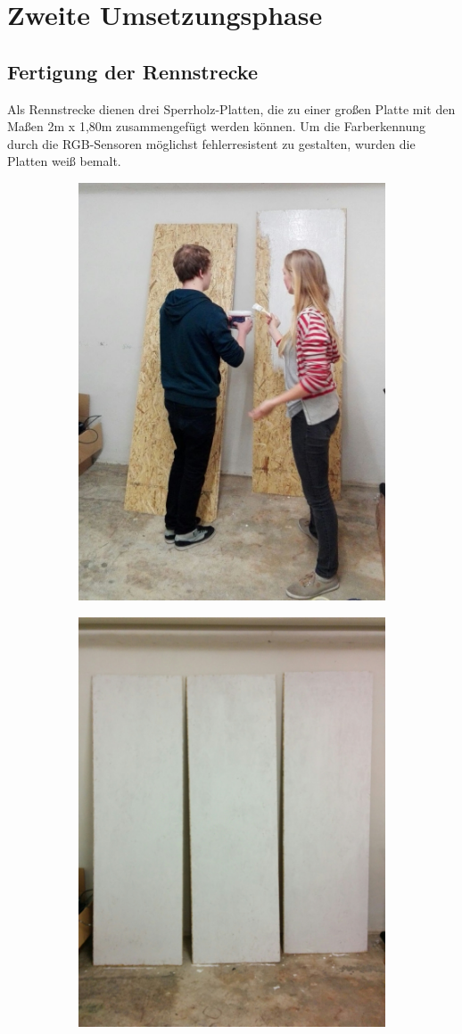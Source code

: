 \documentclass[a4paper,12pt]{article}                                         %
\numberwithin{table}{section}                               %
\numberwithin{figure}{section}                              %
\begin{document}
	\newpage
	\section{Zweite Umsetzungsphase}
	\subsection{Fertigung der Rennstrecke}
	Als Rennstrecke dienen drei Sperrholz-Platten, die zu einer großen Platte mit den Maßen 2m x 1,80m zusammengefügt werden können. Um die Farberkennung durch die RGB-Sensoren möglichst fehlerresistent zu gestalten, wurden die Platten weiß bemalt. 
	
	\begin{figure}[h!]
	\centering
	\begin{subfigure}{.5\textwidth}
	  \centering
	  \includegraphics[width=.6\linewidth]{../Bilder/plattenmalen.jpg}
	  \label{fig:sub1}
	\end{subfigure}%
	\begin{subfigure}{.5\textwidth}
	  \centering
	  \includegraphics[width=.6\linewidth]{../Bilder/plattenfertig.jpg}

\end{subfigure}
\end{figure}
\end{document}
